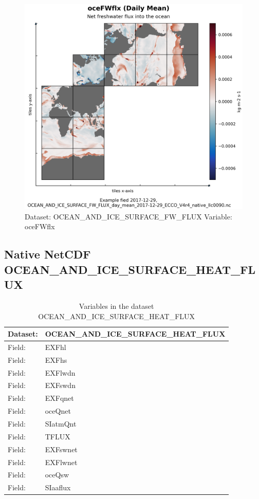\begin{figure}[H]
\centering
\includegraphics[scale=0.55]{../images/plots/native_plots/Ocean_and_Sea-Ice_Surface_Freshwater_Fluxes/oceFWflx.png}
\caption{Dataset: OCEAN\_AND\_ICE\_SURFACE\_FW\_FLUX Variable: oceFWflx}
\label{tab:table-OCEAN_AND_ICE_SURFACE_FW_FLUX_oceFWflx-Plot}
\end{figure}
\pagebreak
\subsection{Native NetCDF OCEAN\_AND\_ICE\_SURFACE\_HEAT\_FLUX}
\newp
\begin{longtable}{|p{}|p{}|}
\caption{Variables in the dataset OCEAN\_AND\_ICE\_SURFACE\_HEAT\_FLUX}
\label{tab:table-OCEAN_AND_ICE_SURFACE_HEAT_FLUX-fields} \\ 
\hline \endhead \hline \endfoot
\rowcolor{lightgray} \textbf{Dataset:} & \textbf{OCEAN\_AND\_ICE\_SURFACE\_HEAT\_FLUX} \\ \hline
Field: &EXFhl \\ \hline
Field: &EXFhs \\ \hline
Field: &EXFlwdn \\ \hline
Field: &EXFswdn \\ \hline
Field: &EXFqnet \\ \hline
Field: &oceQnet \\ \hline
Field: &SIatmQnt \\ \hline
Field: &TFLUX \\ \hline
Field: &EXFswnet \\ \hline
Field: &EXFlwnet \\ \hline
Field: &oceQsw \\ \hline
Field: &SIaaflux \\ \hline
\end{longtable}

